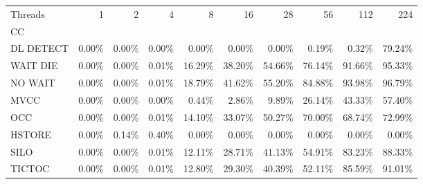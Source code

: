 \begin{tabular}{lrrrrrrrrr}
\toprule
Threads &   1   &   2   &   4   &    8   &    16  &    28  &    56  &    112 &    224 \\
CC        &       &       &       &        &        &        &        &        &        \\
\midrule
DL DETECT & 0.00\% & 0.00\% & 0.00\% &  0.00\% &  0.00\% &  0.00\% &  0.19\% &  0.32\% & 79.24\% \\
WAIT DIE  & 0.00\% & 0.00\% & 0.01\% & 16.29\% & 38.20\% & 54.66\% & 76.14\% & 91.66\% & 95.33\% \\
NO WAIT   & 0.00\% & 0.00\% & 0.01\% & 18.79\% & 41.62\% & 55.20\% & 84.88\% & 93.98\% & 96.79\% \\
MVCC      & 0.00\% & 0.00\% & 0.00\% &  0.44\% &  2.86\% &  9.89\% & 26.14\% & 43.33\% & 57.40\% \\
OCC       & 0.00\% & 0.00\% & 0.01\% & 14.10\% & 33.07\% & 50.27\% & 70.00\% & 68.74\% & 72.99\% \\
HSTORE    & 0.00\% & 0.14\% & 0.40\% &  0.00\% &  0.00\% &  0.00\% &  0.00\% &  0.00\% &  0.00\% \\
SILO      & 0.00\% & 0.00\% & 0.01\% & 12.11\% & 28.71\% & 41.13\% & 54.91\% & 83.23\% & 88.33\% \\
TICTOC    & 0.00\% & 0.00\% & 0.01\% & 12.80\% & 29.30\% & 40.39\% & 52.11\% & 85.59\% & 91.01\% \\
\bottomrule
\end{tabular}
